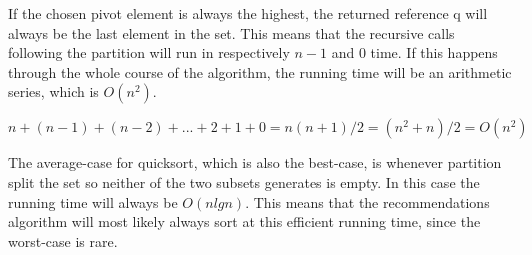If the chosen pivot element is always the highest, the returned reference q will always be the last element in the set. This means that the recursive calls following the partition will run in respectively $n-1$ and $0$ time. If this happens through the whole course of the algorithm, the running time will be an arithmetic series\cite{AlgoAnal2},  which is $O(n^2)$.

\[
n + (n-1) + (n-2) + ... + 2 + 1 + 0 = n(n + 1) / 2 = (n^2 + n) / 2 = O(n^2)
\]

The average-case for quicksort, which is also the best-case, is whenever partition split the set so neither of the two subsets generates is empty. In this case the running time will always be $O(nlgn)$. This means that the recommendations algorithm will most likely always sort at this efficient running time, since the worst-case is rare.